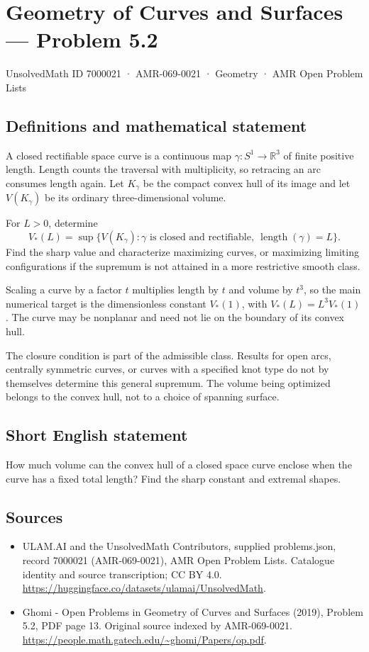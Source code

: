 \documentclass[11pt,a4paper]{article}
\begin{document}
\section*{Geometry of Curves and Surfaces — Problem 5.2}\label{7000021}
{\small UnsolvedMath ID 7000021 · AMR-069-0021 · Geometry · AMR Open Problem Lists}
\subsection{Definitions and mathematical statement}
A closed rectifiable space curve is a continuous map
$\gamma:S^1\to\mathbb R^3$ of finite positive length. Length
counts the traversal with multiplicity, so retracing an arc
consumes length again. Let $K_\gamma$ be the compact convex hull
of its image and let $V(K_\gamma)$ be its ordinary
three-dimensional volume.

For $L>0$, determine
\[
 V_*(L)=\sup\{V(K_\gamma):\gamma\text{ is closed and rectifiable},
                              \ \operatorname{length}(\gamma)=L\}.
\]
Find the sharp value and characterize maximizing curves, or
maximizing limiting configurations if the supremum is not
attained in a more restrictive smooth class.

Scaling a curve by a factor $t$ multiplies length by $t$ and
volume by $t^3$, so the main numerical target is the dimensionless
constant $V_*(1)$, with $V_*(L)=L^3V_*(1)$. The curve may be
nonplanar and need not lie on the boundary of its convex hull.

The closure condition is part of the admissible class. Results
for open arcs, centrally symmetric curves, or curves with a
specified knot type do not by themselves determine this general
supremum. The volume being optimized belongs to the convex hull,
not to a choice of spanning surface.
\subsection{Short English statement}
How much volume can the convex hull of a closed space curve enclose
when the curve has a fixed total length? Find the sharp constant
and extremal shapes.
\subsection{Sources}
\begin{itemize}
\item[S1] ULAM.AI and the UnsolvedMath Contributors, supplied problems.json, record 7000021 (AMR-069-0021), AMR Open Problem Lists. Catalogue identity and source transcription; CC BY 4.0.
\url{https://huggingface.co/datasets/ulamai/UnsolvedMath}.
\item[S2] Ghomi - Open Problems in Geometry of Curves and Surfaces (2019), Problem 5.2, PDF page 13. Original source indexed by AMR-069-0021.
\url{https://people.math.gatech.edu/~ghomi/Papers/op.pdf}.
\end{itemize}
\end{document}
